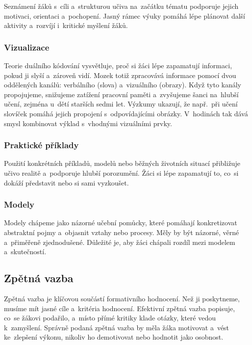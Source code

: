 \documentclass[male,czech,api_bc]{kitheses}
\begin{document}
Seznámení žáků s~cíli a~strukturou učiva na~začátku tématu podporuje jejich motivaci, orientaci a~pochopení. Jasný rámec výuky pomáhá lépe plánovat další aktivity a~rozvíjí i~kritické myšlení žáků.

\subsubsection{Vizualizace}

Teorie duálního kódování vysvětluje, proč si žáci lépe zapamatují informaci, pokud ji slyší a~zároveň vidí. Mozek totiž zpracovává informace pomocí dvou oddělených kanálů: verbálního (slova) a~vizuálního (obrazy). Když tyto kanály propojujeme, snižujeme zatížení pracovní paměti a~zvyšujeme šanci na~hlubší učení, zejména u~dětí starších sedmi let. Výzkumy ukazují, že např.~při učení slovíček pomáhá jejich propojení s~odpovídajícími obrázky. V~hodinách tak dává smysl kombinovat výklad s~vhodnými vizuálními prvky.

\subsubsection{Praktické příklady}

Použití konkrétních příkladů, modelů nebo běžných životních situací přibližuje učivo realitě a~podporuje hlubší porozumění. Žáci si lépe zapamatují to, co~si dokáží představit nebo si sami vyzkoušet.

\subsubsection{Modely}

Modely chápeme jako názorné učební pomůcky, které pomáhají konkretizovat abstraktní pojmy a~objasnit vztahy nebo procesy. Měly by být názorné, věrné a~přiměřeně zjednodušené. Důležité je, aby žáci chápali rozdíl mezi modelem a~skutečností.

\subsection{Zpětná vazba}

Zpětná vazba je klíčovou součástí formativního hodnocení. Než ji poskytneme, musíme mít jasné cíle a~kritéria hodnocení. Efektivní zpětná vazba popisuje, co~se žákovi podařilo, a~místo přímé kritiky klade otázky, které vedou k~zamyšlení. Správně podaná zpětná vazba by měla žáka motivovat a~vést ke~zlepšení výkonu, nikoliv ho demotivovat nebo hodnotit jako osobnost.
\end{document}
